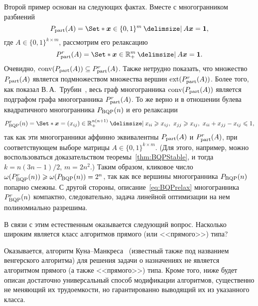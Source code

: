 Второй пример основан на следующих фактах. Вместе с многогранником разбиений \begin{equation*}
\Part(A) = \Set*{\bm{x}\in\{0,1\}^m \given A \bm{x} = \bm{1}},
\end{equation*}
где $A \in \{0,1\}^{k \times m}$, рассмотрим его релаксацию
\begin{equation*}
\Part^r(A) = \Set*{\bm{x}\in\R^m_+ \given A \bm{x} = \bm{1}}.
\end{equation*}
Очевидно, $\operatorname{conv}(P_{\textup{part}}(A)) \subseteq P_{\textup{part}}^r(A)$. 
Также нетрудно показать, что множество $P_{\textup{part}}(A)$ является подмножеством множества вершин $\operatorname{ext}(P_{\textup{part}}^r(A))$.
Более того, как показал В.\,А.~Трубин~\cite{Trubin:1969}, весь граф многогранника $\operatorname{conv}(P_{\textup{part}}(A))$ является подграфом графа многогранника $P_{\textup{part}}^r(A)$.
То же верно и в отношении булева квадратичного многогранника $P_{\textup{BQP}}(n)$ и его релаксации~\cite{Bondarenko:1987,Padberg:1989}
\begin{equation}
\label{eq:BQPrelax}
\BQP^r(n) = \Set*{\bm{x} = (x_{ij})\in\R^{n(n+1)}_+ \given 
x_{ii} \ge x_{ij}, \ x_{jj} \ge x_{ij}, \ x_{ii} + x_{jj} - x_{ij} \le 1},
\end{equation}
так как эти многогранники аффинно эквивалентны $P_{\textup{part}}(A)$ и $P_{\textup{part}}^r(A)$, при соответствующем выборе матрицы $A \in \{0,1\}^{k \times m}$. (Для этого, например, можно воспользоваться доказательством теоремы~\ref{thm:BQPStable}, и тогда $k = n(3n-1)/2$, $m = 2n^2$.)
Таким образом, кликовое число $\omega(P_{\textup{BQP}}^r(n)) \geqslant \omega(P_{\textup{BQP}}(n)) = 2^n$, так как все вершины многогранника $P_{\textup{BQP}}(n)$ попарно смежны.
С другой стороны, описание~\eqref{eq:BQPrelax} многогранника $P_{\textup{BQP}}^r(n)$ компактно, следовательно, задача линейной оптимизации на нем полиномиально разрешима.

В связи с этим естественным оказывается следующий вопрос.
Насколько широким является класс алгоритмов прямого (или <<прямого>>) типа?

Оказывается, алгоритм Куна--Манкреса~\cite{Kuhn:1955,Munkres:1957} (известный также под названием венгерского алгоритма) для решения задачи о назначениях не является алгоритмом прямого (а также <<прямого>>) типа.
Кроме того, ниже будет описан достаточно универсальный способ модификации алгоритмов,
существенно не меняющий их трудоемкости, но гарантированно выводящий их из указанного класса.

